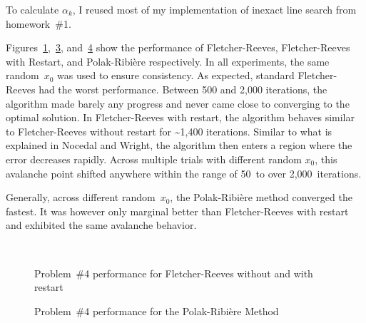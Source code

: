 \noindent
To calculate $\alpha_{k}$, I reused most of my implementation of inexact line search from homework~\#1.

Figures~\ref{fig:p04:FR},~\ref{fig:p04:FRwithRestart}, and~\ref{fig:p04:PR} show the performance of Fletcher-Reeves, Fletcher-Reeves with Restart, and Polak-Ribi\`{e}re respectively. In all experiments, the same random~$x_0$ was used to ensure consistency.  As expected, standard Fletcher-Reeves had the worst performance. Between 500 and 2,000 iterations, the algorithm made barely any progress and never came close to converging to the optimal solution.  In Fletcher-Reeves with restart, the algorithm behaves similar to Fletcher-Reeves without restart for \textasciitilde1,400 iterations.  Similar to what is explained in Nocedal and Wright, the algorithm then enters a region where the error decreases rapidly.  Across multiple trials with different random $x_0$, this avalanche point shifted anywhere within the range of 50~to over 2,000~iterations.

Generally, across different random~$x_0$, the Polak-Ribi\`{e}re method converged the fastest.  It was however only marginal better than Fletcher-Reeves with restart and exhibited the same avalanche behavior.

\begin{figure}[p]
  \centering
  \begin{subfigure}[t]{0.48\textwidth}
    
    \caption{}\label{fig:p04:FR}
  \end{subfigure}
  ~
  \begin{subfigure}[t]{0.48\textwidth}
    
    \caption{}\label{fig:p04:FRwithRestart}
  \end{subfigure}
  \caption{Problem~\#4 performance for Fletcher-Reeves without and with restart}
\end{figure}

\begin{figure}[p]
  \centering
  
  \caption{Problem~\#4 performance for the Polak-Ribi\`{e}re Method}\label{fig:p04:PR}
\end{figure}
